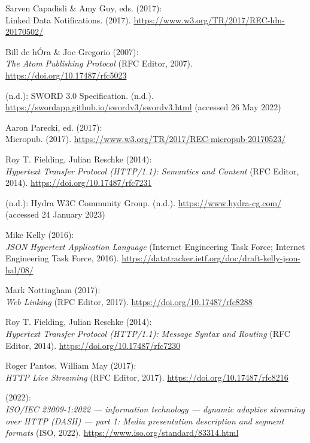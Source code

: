 \begin{thebibliography}{9}
Sarven Capadisli \& Amy Guy, eds. (2017): \\
Linked {Data Notifications}.
(2017). \url{https://www.w3.org/TR/2017/REC-ldn-20170502/}

Bill de hÓra \& Joe Gregorio (2007): \\
\emph{The {Atom Publishing Protocol}} ({RFC Editor}, 2007).
\url{https://doi.org/10.17487/rfc5023}

(n.d.): {SWORD} 3.0 {Specification}. (n.d.).
\url{https://swordapp.github.io/swordv3/swordv3.html} (accessed 26 May
2022)

Aaron Parecki, ed. (2017): \\
Micropub. (2017).
\url{https://www.w3.org/TR/2017/REC-micropub-20170523/}

Roy T. Fielding, Julian Reschke (2014): \\
\emph{Hypertext {Transfer Protocol} ({HTTP}/1.1): {Semantics} and {Content}} ({RFC Editor}, 2014).
\url{https://doi.org/10.17487/rfc7231}

(n.d.): Hydra {W3C Community Group}. (n.d.).
\url{https://www.hydra-cg.com/} (accessed 24 January 2023)

Mike Kelly (2016): \\
\emph{{JSON Hypertext Application Language}}
(Internet Engineering Task Force; Internet Engineering Task Force,
2016). \url{https://datatracker.ietf.org/doc/draft-kelly-json-hal/08/}

Mark Nottingham (2017): \\
\emph{Web {Linking}} ({RFC Editor}, 2017).
\url{https://doi.org/10.17487/rfc8288}

Roy T. Fielding, Julian Reschke (2014): \\
\emph{Hypertext {Transfer
Protocol} ({HTTP}/1.1): {Message Syntax} and {Routing}} ({RFC Editor},
2014).
\url{https://doi.org/10.17487/rfc7230}

Roger Pantos, William May (2017): \\
\emph{{HTTP Live Streaming}} ({RFC
Editor}, 2017).
\url{https://doi.org/10.17487/rfc8216}

(2022): \\
\emph{{ISO}/{IEC} 23009-1:2022 --- information technology ---
dynamic adaptive streaming over HTTP (DASH) --- part 1: Media
presentation description and segment formats} ({ISO}, 2022).
\url{https://www.iso.org/standard/83314.html}


\end{thebibliography}
